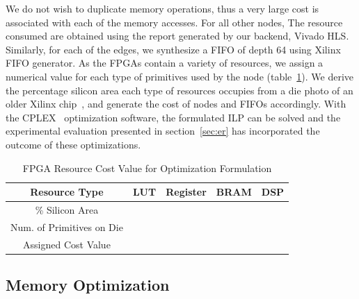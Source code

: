 We do not wish to duplicate memory operations, thus a very large cost
is associated with each of the memory accesses. For all other nodes,
The resource consumed are obtained using the report generated
by our backend, Vivado HLS. 
Similarly, for each of the edges, we synthesize a FIFO of depth 64 using Xilinx FIFO generator. 
As the FPGAs contain a variety of resources,
we assign a numerical value for each type of primitives used by the node (table~\ref{tab:resourcecost}). We derive the percentage silicon area
each type of resources occupies from a die photo of an older Xilinx chip~\cite{wawrzynek2002eecs150},
and generate the cost of nodes and FIFOs accordingly. 
With the CPLEX~\cite{iILO06a} optimization software, the formulated ILP can be solved and the experimental evaluation presented in section~\ref{sec:er} has incorporated the outcome of these optimizations.

\begin{table}[htbp]
\caption{FPGA Resource Cost Value for Optimization Formulation}
\centering
\begin{tabular}{| c | c | c | c | c | }
  \hline            
 \cline{3-5} 
  Resource Type     & LUT& Register & BRAM & DSP    \\
  \hline    
  \cline{3-5}
  \% Silicon Area & & & &\\
  \hline     
  \cline{3-5}
  Num. of Primitives on Die & & & &\\
  \hline     
  
  Assigned Cost Value & & & & \\
\hline                                                                                                           

\end{tabular}
\label{tab:resourcecost}

\end{table}





\subsection{Memory Optimization}
\label{sec:optmem}
